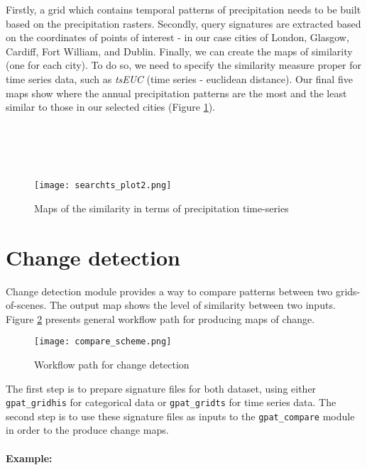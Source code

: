 Firstly, a grid which contains temporal patterns of precipitation needs to be built based on the precipitation rasters.
Secondly, query signatures are extracted based on the coordinates of points of interest - in our case cities of London, Glasgow, Cardiff, Fort William, and Dublin. Finally, we can create the maps of similarity (one for each city). 
To do so, we need to specify the similarity measure proper for time series data, such as {\it tsEUC} (time series - euclidean distance).
Our final five maps show where the annual precipitation patterns are the most and the least similar to those in our selected cities (Figure \ref{FIG:SEARCHTS2}). \\\\\\\\\\

\begin{figure}[H]
        \begin{center}
	\texttt{[image: searchts\_plot2.png]}
	\caption{Maps of the similarity in terms of precipitation time-series}
	\label{FIG:SEARCHTS2}
        \end{center}
\end{figure}

\FloatBarrier

\section{Change detection}

Change detection module provides a way to compare patterns between two grids-of-scenes.
The output map shows the level of similarity between two inputs.
Figure \ref{FIG:CHANGE} presents general workflow path for producing maps of change. 

\begin{figure}[H]
	\centering
	\texttt{[image: compare\_scheme.png]}
	\caption{Workflow path for change detection}
	\label{FIG:CHANGE}
\end{figure}

The first step is to prepare signature files for both dataset, using either {\tt gpat\_gridhis} for categorical data or {\tt gpat\_gridts} for time series data.
The second step is to use these signature files as inputs to the {\tt gpat\_compare} module in order to the produce change maps. \\\\

{\bf Example:}

